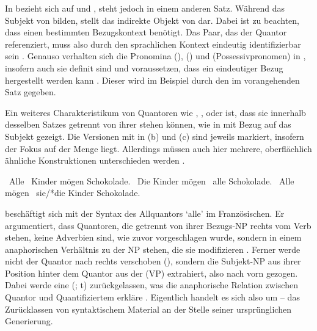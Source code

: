 In  bezieht sich  auf  und ,
steht jedoch in einem anderen Satz. Während  das Subjekt
von  bilden, stellt  das indirekte Objekt von
 dar. Dabei ist zu beachten, dass  einen
bestimmten Bezugskontext benötigt. Das Paar, das
der Quantor referenziert, muss also durch den sprachlichen Kontext eindeutig
identifizierbar sein
\autocites[vgl.~z.\,B.][274]{lyons1999}[788]{schwartz2000}[983]{janssen2004}.
Genauso verhalten sich die Pronomina  (),
 () und  (Possessivpronomen) in
, insofern auch sie definit sind und
voraussetzen, dass ein eindeutiger Bezug hergestellt werden kann
\autocites[vgl.][145--148]{lyons1999}. Dieser wird im Beispiel durch den
 im vorangehenden Satz gegeben.

Ein weiteres Charakteristikum von Quantoren wie ,
,  oder  ist, dass sie innerhalb desselben
Satzes getrennt von ihrer  stehen können, wie in
 mit Bezug auf das Subjekt gezeigt. Die Versionen mit
 in (b) und (c) sind jeweils markiert,
insofern der Fokus auf der Menge liegt. Allerdings müssen auch hier mehrere,
oberflächlich ähnliche Konstruktionen unterschieden werden
\autocites[27--28]{pittner1995}[65--67]{fanselowcavar2002}.

\begin{exe}
\ex \label{ex:floatsubj}
\begin{xlist}
	\ex \label{ex:floatsubj_1}
		{\ob}~Alle {\ob}~Kinder{\cb}{\cb} mögen Schokolade.
	\ex \label{ex:floatsubj_2}
		{\ob}~Die Kinder{\cb} mögen {\ob}~alle{\cb}
		Schokolade.
	\ex \label{ex:floatsubj_3}
		{\ob}~Alle{\cb} mögen {\ob}~sie/*die
		Kinder{\cb} Schokolade.
\end{xlist}
\end{exe}

\citet{sportiche1988} beschäftigt sich mit der Syntax des Allquantors 
`alle' im Französischen. Er argumentiert, dass Quantoren, die
getrennt von ihrer Bezugs-NP rechts vom Verb stehen, keine
Adverbien sind, wie zuvor vorgeschlagen wurde, sondern in einem
anaphorischen Verhältnis zu der NP stehen, die sie modifizieren
\autocite[428--433]{sportiche1988}. Ferner werde nicht der Quantor nach rechts
verschoben (), sondern die Subjekt-NP aus ihrer Position hinter
dem Quantor aus der  (VP) extrahiert, also nach vorn gezogen.
Dabei werde eine  (; t) zurückgelassen, was die
anaphorische Relation zwischen Quantor und Quantifiziertem erkläre
\autocite[432--433]{sportiche1988}. Eigentlich handelt es sich also um
 -- das Zurücklassen von syntaktischem Material an der Stelle
seiner ursprünglichen Generierung.

